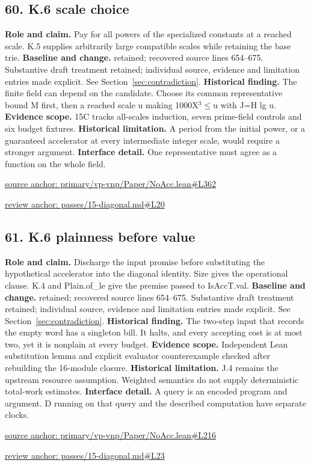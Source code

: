 \documentclass[11pt,letterpaper]{article}
\theoremstyle{definition}\newtheorem{definition}[theorem]{Definition}\newtheorem{example}[theorem]{Example}
\theoremstyle{remark}\newtheorem{remark}[theorem]{Remark}
\begin{document}
\subsection*{60. K.6 scale choice}
\textbf{Role and claim.} Pay for all powers of the specialized constants at a reached scale. K.5 supplies arbitrarily large compatible scales while retaining the base trie.
\textbf{Baseline and change.} retained; recovered source lines 654--675. Substantive draft treatment retained; individual source, evidence and limitation entries made explicit. See Section~\ref{sec:contradiction}.
\textbf{Historical finding.} The finite field can depend on the candidate. Choose its common representative bound M first, then a reached scale u making 1000X\ensuremath{{}^3}\ensuremath{\le}u with J=H lg u.
\textbf{Evidence scope.} 15C tracks all-scales induction, seven prime-field controls and six budget fixtures.
\textbf{Historical limitation.} A period from the initial power, or a guaranteed accelerator at every intermediate integer scale, would require a stronger argument.
\textbf{Interface detail.} One representative must agree as a function on the whole field.
\par\href{https://github.com/nousentllc/VP-VNP-Review/blob/8a7976933b6b2b4ffda1ad3a0dfb5fc6b6f023e8/primary/vp-vnp/Paper/NoAcc.lean\#L362}{source anchor: primary/vp-vnp/Paper/NoAcc.lean\#L362}
\par\href{https://github.com/nousentllc/VP-VNP-Review/blob/8a7976933b6b2b4ffda1ad3a0dfb5fc6b6f023e8/passes/15-diagonal.md\#L20}{review anchor: passes/15-diagonal.md\#L20}
\goodbreak
\subsection*{61. K.6 plainness before value}
\textbf{Role and claim.} Discharge the input promise before substituting the hypothetical accelerator into the diagonal identity. Size gives the operational clause. K.4 and Plain.of\_le give the premise passed to IsAccT.val.
\textbf{Baseline and change.} retained; recovered source lines 654--675. Substantive draft treatment retained; individual source, evidence and limitation entries made explicit. See Section~\ref{sec:contradiction}.
\textbf{Historical finding.} The two-step input that records the empty word has a singleton bill. It halts, and every accepting cost is at most two, yet it is nonplain at every budget.
\textbf{Evidence scope.} Independent Lean substitution lemma and explicit evaluator counterexample checked after rebuilding the 16-module closure.
\textbf{Historical limitation.} J.4 remains the upstream resource assumption. Weighted semantics do not supply deterministic total-work estimates.
\textbf{Interface detail.} A query is an encoded program and argument. D running on that query and the described computation have separate clocks.
\par\href{https://github.com/nousentllc/VP-VNP-Review/blob/8a7976933b6b2b4ffda1ad3a0dfb5fc6b6f023e8/primary/vp-vnp/Paper/NoAcc.lean\#L216}{source anchor: primary/vp-vnp/Paper/NoAcc.lean\#L216}
\par\href{https://github.com/nousentllc/VP-VNP-Review/blob/8a7976933b6b2b4ffda1ad3a0dfb5fc6b6f023e8/passes/15-diagonal.md\#L23}{review anchor: passes/15-diagonal.md\#L23}
\goodbreak
\end{document}
